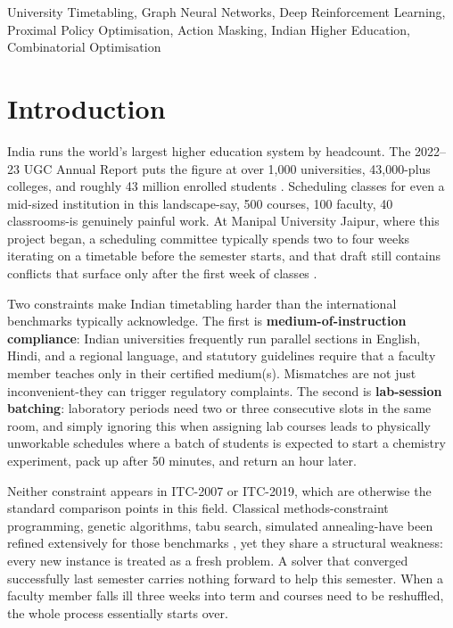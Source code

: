 \documentclass[conference]{IEEEtran}
\begin{document}
\begin{IEEEkeywords}
University Timetabling, Graph Neural Networks, Deep Reinforcement Learning, Proximal Policy Optimisation, Action Masking, Indian Higher Education, Combinatorial Optimisation
\end{IEEEkeywords}


\section{Introduction}
\label{sec:intro}

India runs the world's largest higher education system by headcount. The 2022--23 UGC Annual Report puts the figure at over 1,000 universities, 43,000-plus colleges, and roughly 43 million enrolled students \cite{ugc2023}. Scheduling classes for even a mid-sized institution in this landscape-say, 500 courses, 100 faculty, 40 classrooms-is genuinely painful work. At Manipal University Jaipur, where this project began, a scheduling committee typically spends two to four weeks iterating on a timetable before the semester starts, and that draft still contains conflicts that surface only after the first week of classes \cite{battistutta2017}.

Two constraints make Indian timetabling harder than the international benchmarks typically acknowledge. The first is \textbf{medium-of-instruction compliance}: Indian universities frequently run parallel sections in English, Hindi, and a regional language, and statutory guidelines require that a faculty member teaches only in their certified medium(s). Mismatches are not just inconvenient-they can trigger regulatory complaints. The second is \textbf{lab-session batching}: laboratory periods need two or three consecutive slots in the same room, and simply ignoring this when assigning lab courses leads to physically unworkable schedules where a batch of students is expected to start a chemistry experiment, pack up after 50 minutes, and return an hour later.

Neither constraint appears in ITC-2007 or ITC-2019, which are otherwise the standard comparison points in this field. Classical methods-constraint programming, genetic algorithms, tabu search, simulated annealing-have been refined extensively for those benchmarks \cite{digaspero2007,muller2018}, yet they share a structural weakness: every new instance is treated as a fresh problem. A solver that converged successfully last semester carries nothing forward to help this semester. When a faculty member falls ill three weeks into term and courses need to be reshuffled, the whole process essentially starts over.
\end{document}

